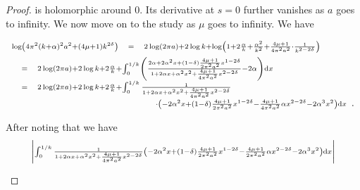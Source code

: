 \documentclass{jams-l}
\theoremstyle{definition}
\theoremstyle{remark}
\numberwithin{equation}{section}
\begin{document}
\begin{proof}
                        \noindent is holomorphic around $0$. Its derivative at $s=0$ further vanishes as $a$ goes to infinity. We now move on to the study as $\mu$ goes to infinity. We have
                        
                        \[ \begin{array}{lllll}
                                \multicolumn{3}{l}{\scriptstyle \log \left( 4 \pi^2 \left( k + \alpha \right)^2 a^2 + \left( 4 \mu + 1 \right) k^{2 \delta} \right)} & \scriptstyle = & \scriptstyle 2 \log \left( 2 \pi a \right) + 2 \log k + \log \left( 1 + 2 \frac{\alpha}{k} + \frac{\alpha^2}{k^2} + \frac{4 \mu + 1}{4 \pi^2 a^2} \cdot \frac{1}{k^{2 - 2 \delta}} \right) \\[0.5em]
                                
                                & \scriptstyle = & \multicolumn{3}{l}{\scriptstyle 2 \log \left( 2 \pi a \right) + 2 \log k + 2 \frac{\alpha}{k} + \int_0^{1/k} \left( \frac{2 \alpha + 2 \alpha^2 x + \left( 1-\delta \right) \frac{4 \mu + 1}{2 \pi^2 a^2} x^{1-2\delta}}{1 + 2 \alpha x + \alpha^2 x^2 + \frac{4 \mu + 1}{4 \pi^2 a^2} x^{2-2\delta}} - 2 \alpha \right) \mathrm{d}x} \\[0.5em]
                                
                                & \scriptstyle = & \multicolumn{3}{l}{\scriptstyle 2 \log \left( 2 \pi a \right) + 2 \log k + 2 \frac{\alpha}{k} + \int_0^{1/k} \frac{1}{1 + 2 \alpha x + \alpha^2 x^2 + \frac{4 \mu + 1}{4 \pi^2 a^2} x^{2-2\delta}}} \\[0.5em]
                                
                                && \multicolumn{3}{l}{\qquad \qquad \qquad \qquad \qquad \qquad \scriptstyle \cdot \left( - 2 \alpha^2 x + \left( 1-\delta \right) \frac{4 \mu + 1}{2 \pi^2 a^2} x^{1-2\delta} - \frac{4 \mu + 1}{4 \pi^2 a^2} \alpha x^{2-2\delta} - 2 \alpha^3 x^2 \right) \mathrm{d}x}.
                            \end{array} \]
                        
                        \noindent After noting that we have
                        \[ \begin{array}{lll}
                                \multicolumn{3}{l}{\scriptstyle \left \vert \int_0^{1/k} \frac{1}{1 + 2 \alpha x + \alpha^2 x^2 + \frac{4 \mu + 1}{4 \pi^2 a^2} x^{2-2\delta}} \left( - 2 \alpha^2 x + \left( 1-\delta \right) \frac{4 \mu + 1}{2 \pi^2 a^2} x^{1-2\delta} - \frac{4 \mu + 1}{2 \pi^2 a^2} \alpha x^{2-2\delta} - 2 \alpha^3 x^2 \right) \mathrm{d}x \right \vert} \\[1em]
                                

\end{array}\]
\end{proof}
\end{document}
